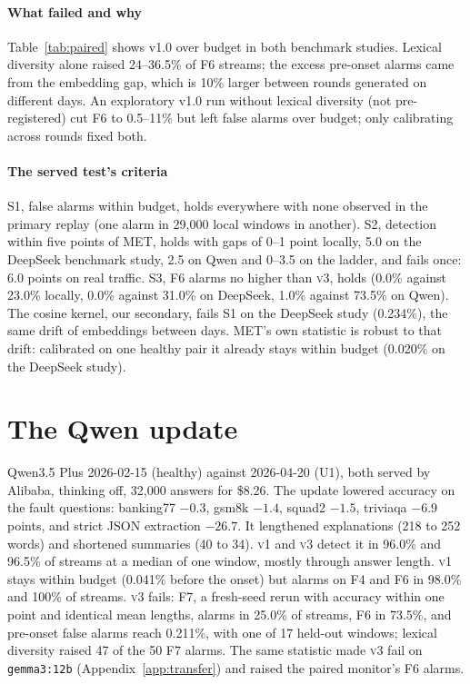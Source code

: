 \documentclass{article}
\newcommand{\vone}{\textsc{v1}}
\newcommand{\vthree}{\textsc{v3}}
\begin{document}
\paragraph{What failed and why} Table~\ref{tab:paired} shows v1.0 over budget in
both benchmark studies. Lexical diversity alone raised 24--36.5\% of F6 streams;
the excess pre-onset alarms came from the embedding gap, which is 10\% larger
between rounds generated on different days. An exploratory v1.0 run without lexical
diversity (not pre-registered) cut F6 to 0.5--11\% but left false alarms over
budget; only calibrating across rounds fixed both.

\paragraph{The served test's criteria} S1, false alarms within budget, holds
everywhere with none observed in the primary replay (one alarm in 29{,}000 local
windows in another). S2, detection within five points of MET, holds with gaps of
0--1 point locally, 5.0 on the DeepSeek benchmark study, 2.5 on Qwen and 0--3.5 on
the ladder, and fails once: 6.0 points on real traffic. S3, F6 alarms no higher
than \vthree{}, holds (0.0\% against 23.0\% locally, 0.0\% against 31.0\% on
DeepSeek, 1.0\% against 73.5\% on Qwen). The cosine kernel, our secondary, fails S1
on the DeepSeek study (0.234\%), the same drift of embeddings between days.
MET's own statistic is robust to that drift: calibrated on one healthy pair it
already stays within budget (0.020\% on the DeepSeek study).

\section{The Qwen update}
\label{app:qwen}

Qwen3.5 Plus 2026-02-15 (healthy) against 2026-04-20 (U1), both served by Alibaba,
thinking off, 32{,}000 answers for \$8.26. The update lowered accuracy on the fault
questions: banking77 $-0.3$, gsm8k $-1.4$, squad2 $-1.5$, triviaqa $-6.9$ points,
and strict JSON extraction $-26.7$. It lengthened explanations (218 to 252 words)
and shortened summaries (40 to 34). \vone{} and \vthree{} detect it in 96.0\% and
96.5\% of streams at a median of one window, mostly through answer length. \vone{}
stays within budget (0.041\% before the onset) but alarms on F4 and F6 in 98.0\% and
100\% of streams. \vthree{} fails: F7, a fresh-seed rerun with accuracy within one
point and identical mean lengths, alarms in 25.0\% of streams, F6 in 73.5\%, and
pre-onset false alarms reach 0.211\%, with one of 17 held-out windows; lexical
diversity raised 47 of the 50 F7 alarms. The same statistic made \vthree{} fail on
\texttt{gemma3:12b} (Appendix~\ref{app:transfer}) and raised the paired monitor's
F6 alarms.
\end{document}
